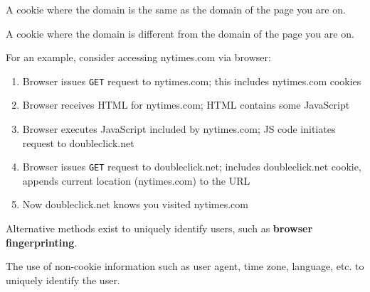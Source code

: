 \begin{definition}
	A cookie where the domain is the same as the domain of the page you are on.
\end{definition}

\begin{definition}
	A cookie where the domain is different from the domain of the page you are on.
\end{definition}

For an example, consider accessing nytimes.com via browser:
\begin{enumerate}[label=\roman*.]
	\item Browser issues \texttt{GET} request to nytimes.com; this includes nytimes.com cookies
	\item Browser receives HTML for nytimes.com; HTML contains some JavaScript
	\item Browser executes JavaScript included by nytimes.com; JS code initiates request to doubleclick.net
	\item Browser issues \texttt{GET} request to doubleclick.net; includes doubleclick.net cookie, appends current location (nytimes.com) to the URL
	\item Now doubleclick.net knows you visited nytimes.com
\end{enumerate}

Alternative methods exist to uniquely identify users, such as \textbf{browser fingerprinting}. 

\begin{definition}
	The use of non-cookie information such as user agent, time zone, language, etc. to uniquely identify the user.
\end{definition}
